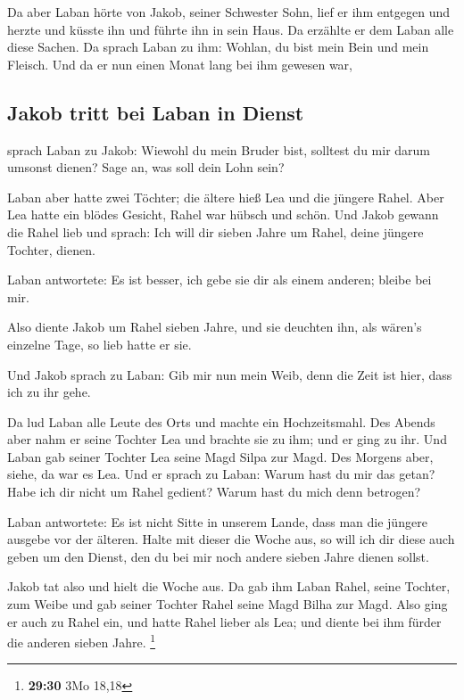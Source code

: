  Da aber Laban hörte von Jakob, seiner Schwester Sohn,
lief er ihm entgegen und herzte und küsste ihn und führte ihn in sein
Haus. Da erzählte er dem Laban alle diese Sachen.  Da
sprach Laban zu ihm: Wohlan, du bist mein Bein und mein Fleisch. Und da
er nun einen Monat lang bei ihm gewesen war,

\hypertarget{jakob-tritt-bei-laban-in-dienst}{%
\subsection{Jakob tritt bei Laban in
Dienst}\label{jakob-tritt-bei-laban-in-dienst}}

 sprach Laban zu Jakob: Wiewohl du mein Bruder bist,
solltest du mir darum umsonst dienen? Sage an, was soll dein Lohn sein?

 Laban aber hatte zwei Töchter; die ältere hieß Lea und
die jüngere Rahel.  Aber Lea hatte ein blödes Gesicht,
Rahel war hübsch und schön.  Und Jakob gewann die Rahel
lieb und sprach: Ich will dir sieben Jahre um Rahel, deine jüngere
Tochter, dienen.

 Laban antwortete: Es ist besser, ich gebe sie dir als
einem anderen; bleibe bei mir.

 Also diente Jakob um Rahel sieben Jahre, und sie
deuchten ihn, als wären's einzelne Tage, so lieb hatte er sie.

 Und Jakob sprach zu Laban: Gib mir nun mein Weib, denn
die Zeit ist hier, dass ich zu ihr gehe.

 Da lud Laban alle Leute des Orts und machte ein
Hochzeitsmahl.  Des Abends aber nahm er seine Tochter Lea
und brachte sie zu ihm; und er ging zu ihr.  Und Laban
gab seiner Tochter Lea seine Magd Silpa zur Magd.  Des
Morgens aber, siehe, da war es Lea. Und er sprach zu Laban: Warum hast
du mir das getan? Habe ich dir nicht um Rahel gedient? Warum hast du
mich denn betrogen?

 Laban antwortete: Es ist nicht Sitte in unserem Lande,
dass man die jüngere ausgebe vor der älteren.  Halte mit
dieser die Woche aus, so will ich dir diese auch geben um den Dienst,
den du bei mir noch andere sieben Jahre dienen sollst.

 Jakob tat also und hielt die Woche aus. Da gab ihm Laban
Rahel, seine Tochter, zum Weibe  und gab seiner Tochter
Rahel seine Magd Bilha zur Magd.  Also ging er auch zu
Rahel ein, und hatte Rahel lieber als Lea; und diente bei ihm fürder die
anderen sieben Jahre. \footnote{\textbf{29:30} 3Mo 18,18}

